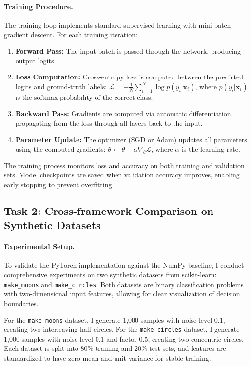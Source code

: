 \documentclass[11pt,a4paper]{article}
\begin{document}
\paragraph{Training Procedure.} The training loop implements standard supervised learning with mini-batch gradient descent. For each training iteration:

\begin{enumerate}
    \item \textbf{Forward Pass:} The input batch is passed through the network, producing output logits.
    \item \textbf{Loss Computation:} Cross-entropy loss is computed between the predicted logits and ground-truth labels: $\mathcal{L} = -\frac{1}{N}\sum_{i=1}^{N} \log p(y_i | \mathbf{x}_i)$, where $p(y_i | \mathbf{x}_i)$ is the softmax probability of the correct class.
    \item \textbf{Backward Pass:} Gradients are computed via automatic differentiation, propagating from the loss through all layers back to the input.
    \item \textbf{Parameter Update:} The optimizer (SGD or Adam) updates all parameters using the computed gradients: $\theta \leftarrow \theta - \alpha \nabla_\theta \mathcal{L}$, where $\alpha$ is the learning rate.
\end{enumerate}

The training process monitors loss and accuracy on both training and validation sets. Model checkpoints are saved when validation accuracy improves, enabling early stopping to prevent overfitting.

\subsection{Task 2: Cross-framework Comparison on Synthetic Datasets}
\paragraph{Experimental Setup.} To validate the PyTorch implementation against the NumPy baseline, I conduct comprehensive experiments on two synthetic datasets from scikit-learn: \texttt{make\_moons} and \texttt{make\_circles}. Both datasets are binary classification problems with two-dimensional input features, allowing for clear visualization of decision boundaries.

For the \texttt{make\_moons} dataset, I generate 1,000 samples with noise level 0.1, creating two interleaving half circles. For the \texttt{make\_circles} dataset, I generate 1,000 samples with noise level 0.1 and factor 0.5, creating two concentric circles. Each dataset is split into 80\% training and 20\% test sets, and features are standardized to have zero mean and unit variance for stable training.
\end{document}
